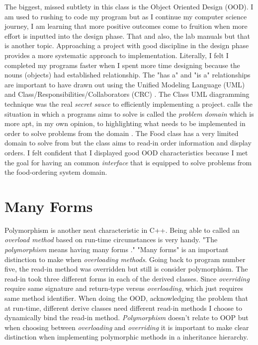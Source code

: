 \documentclass[a4paper,man,biblatex]{apa6}
\begin{document}
The biggest, missed subtlety in this class is the Object Oriented Design (OOD). I am used to rushing to code my program but as I continue my computer science journey, I am learning that more positive outcomes come to fruition when more effort is inputted into the design phase. That and also, the lab manuals but that is another topic. Approaching a project with good discipline in the design phase provides a more systematic approach to implementation. Literally, I felt I completed my programs faster when I spent more time designing because the nouns (objects) had established relationship. The "has a" and "is a" relationships are important to have drawn out using the Unified Modeling Language (UML) and Class/Responsibilities/Collaborators (CRC) \autocite[1208]{prata_c_2012}. The Class UML diagramming technique was the real \textit{secret sauce} to efficiently implementing a project.  calls the situation in which a programs aims to solve is called the \textit{problem domain} which is more apt, in my own opinion, to highlighting what needs to be implemented in order to solve problems from the domain \autocite[1207]{prata_c_2012}. The Food class has a very limited domain to solve from but the class aims to read-in order information and display orders. I felt confident that I displayed good OOD characteristics because I met the goal for having an common \textit{interface} that is equipped to solve problems from the food-ordering system domain.

\section*{Many Forms}
Polymorphism is another neat characteristic in C++. Being able to called an \textit{overload method} based on run-time circumstances is very handy. "The \textit{polymorphism} means having many forms \autocite[412]{prata_c_2012}." "Many forms" is an important distinction to make when \textit{overloading methods}. Going back to program number five, the read-in method was overridden but still is consider polymorphism. The read-in took three different forms in each of the derived classes. Since \textit{overriding} require same signature and return-type versus \textit{overloading}, which just requires same method identifier. When doing the OOD, acknowledging the problem that at run-time, different derive classes need different read-in methods I choose to dynamically bind the read-in method. \textit{Polymorphism} doesn't relate to OOP but when choosing between \textit{overloading} and \textit{overriding} it is important to make clear distinction when implementing polymorphic methods in a inheritance hierarchy.
\end{document}
